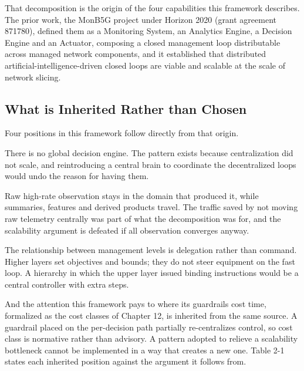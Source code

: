 That decomposition is the origin of the four capabilities this framework
describes. The prior work, the MonB5G project under Horizon 2020 (grant
agreement 871780), defined them as a Monitoring System, an Analytics
Engine, a Decision Engine and an Actuator, composing a closed management
loop distributable across managed network components, and it established
that distributed artificial-intelligence-driven closed loops are viable
and scalable at the scale of network slicing.

\hypertarget{what-is-inherited-rather-than-chosen}{%
\subsection{What is Inherited Rather than Chosen}\label{what-is-inherited-rather-than-chosen}}

Four positions in this framework follow directly from that origin.

There is no global decision engine. The pattern exists because
centralization did not scale, and reintroducing a central brain to
coordinate the decentralized loops would undo the reason for having
them.

Raw high-rate observation stays in the domain that produced it, while
summaries, features and derived products travel. The traffic saved by
not moving raw telemetry centrally was part of what the decomposition
was for, and the scalability argument is defeated if all observation
converges anyway.

The relationship between management levels is delegation rather than
command. Higher layers set objectives and bounds; they do not steer
equipment on the fast loop. A hierarchy in which the upper layer issued
binding instructions would be a central controller with extra steps.

And the attention this framework pays to where its guardrails cost time,
formalized as the cost classes of Chapter 12, is inherited from the same
source. A guardrail placed on the per-decision path partially
re-centralizes control, so cost class is normative rather than advisory.
A pattern adopted to relieve a scalability bottleneck cannot be
implemented in a way that creates a new one. Table 2-1 states each
inherited position against the argument it follows from.

